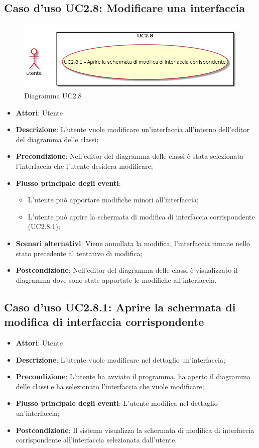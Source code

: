 \documentclass[../AnalisiDeiRequisiti.tex]{subfiles}
\begin{document}
		\subsection{Caso d'uso UC2.8: Modificare una interfaccia}
		\begin{figure} [H]
			\centering
			\includegraphics[scale=0.45]{./Figures/UC2_8.png}
			\caption{Diagramma UC2.8}\label{}
		\end{figure}
		\begin{itemize}
			\item \textbf{Attori}: Utente
			\item \textbf{Descrizione}: L'utente vuole modificare un'interfaccia all'interno dell'editor del diagramma delle classi;
			\item \textbf{Precondizione}: Nell'editor del diagramma delle classi è stata selezionata l'interfaccia che l'utente desidera modificare;
			\item \textbf{Flusso principale degli eventi}: \begin{itemize}
				\item L'utente può apportare modifiche minori all'interfaccia;
				\item L'utente può aprire la schermata di modifica di interfaccia corrispondente (UC2.8.1);
			\end{itemize}
			\item \textbf{Scenari alternativi}: Viene annullata la modifica, l'interfaccia rimane nello stato precedente al tentativo di modifica;
			\item \textbf{Postcondizione}: Nell'editor del diagramma delle classi è visualizzato il diagramma dove sono state apportate le modifiche all'interfaccia.
		\end{itemize}
		\subsection{Caso d'uso UC2.8.1: Aprire la schermata di modifica di interfaccia corrispondente}
		\begin{itemize}
			\item \textbf{Attori}: Utente
			\item \textbf{Descrizione}: L'utente vuole modificare nel dettaglio un'interfaccia;
			\item \textbf{Precondizione}: L'utente ha avviato il programma, ha aperto il diagramma delle classi e ha selezionato l'interfaccia che vuole modificare;
			\item \textbf{Flusso principale degli eventi}: L'utente modifica nel dettaglio un'interfaccia;
			\item \textbf{Postcondizione}: Il sistema visualizza la schermata di modifica di interfaccia corrispondente all'interfaccia selezionata dall'utente.
		\end{itemize}
\end{document}
